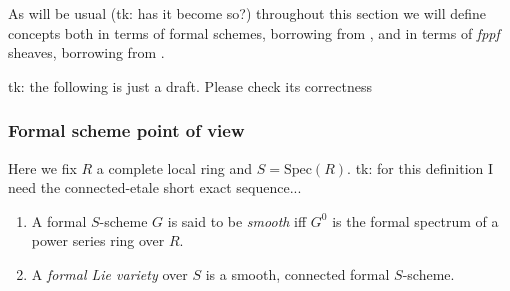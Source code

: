 \documentclass[../Main]{subfiles}
\begin{document}
As will be usual (tk: has it become so?) throughout this section we will define
concepts both in terms of formal schemes, borrowing from \cite{Shatz},
and in terms of {\em fppf} sheaves, borrowing from \cite{Messing}.


tk: the following is just a draft. Please check its correctness

\subsubsection{Formal scheme point of view}
Here we fix $R$ a complete local ring and $S = \mathrm{Spec}(R)$.
tk: for this definition I need the connected-etale short exact sequence...
\begin{defn}\leavevmode\vspace{-.2\baselineskip}
\begin{enumerate}
	\item A formal $S$-scheme $G$ is said to be {\em smooth} iff
		$G^0$ is the formal spectrum of a power series ring over $R$.
	\item A {\em formal Lie variety} over $S$ is a smooth, connected formal $S$-scheme.
\end{enumerate}
\end{defn}
\end{document}
